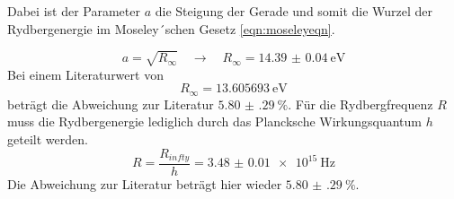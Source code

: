 \newpage
\begin{flushleft}
Dabei ist der Parameter $a$ die Steigung der Gerade und somit die Wurzel der Rydbergenergie im Moseley´schen Gesetz \ref{eqn:moseleyeqn}.
\end{flushleft}
\begin{equation}
a = \sqrt{R_{\infty}} \quad \to \quad R_{\infty} = \SI{14.39(4)}{\electronvolt}
\end{equation}
Bei einem Literaturwert von \cite{chemie}
\begin{equation}
R_{\infty} = \SI{13.605693}{\electronvolt}
\end{equation}
beträgt die Abweichung zur Literatur $\SI{5.80(29)}{\percent}$.
Für die Rydbergfrequenz $R$ muss die Rydbergenergie lediglich durch das Plancksche Wirkungsquantum $h$ geteilt werden.
\begin{equation}
R = \frac{R_{infty}}{h} = \SI{3.48(1)e15}{\hertz}
\end{equation}
Die Abweichung zur Literatur beträgt hier wieder $\SI{5.80(29)}{\percent}$.

